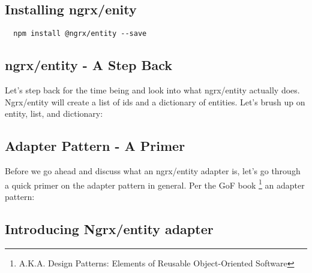 \subsection{ Installing ngrx/enity }
\begin{verbatim}
  npm install @ngrx/entity --save
\end{verbatim}

\subsection{ ngrx/entity - A Step Back }
Let's step back for the time being and look into what ngrx/entity actually does.
Ngrx/entity will create a list of ids and a dictionary of entities. Let's brush
up on entity, list, and dictionary:

\subsection{ Adapter Pattern - A Primer  }
Before we go ahead and discuss what an ngrx/entity adapter is, let's go through
a quick primer on the adapter pattern in general. Per the GoF book
\footnote{A.K.A. Design Patterns: Elements of Reusable Object-Oriented Software}
an adapter pattern:


\subsection{ Introducing Ngrx/entity adapter }
